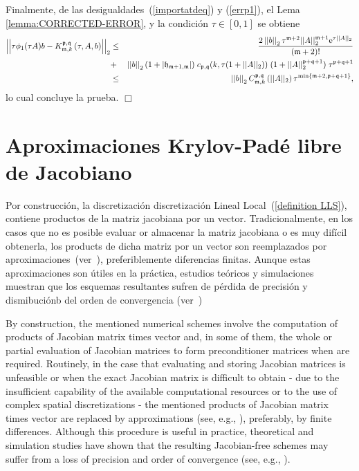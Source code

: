Finalmente, de las desigualdades~(\ref{importatdeq}) y (\ref{errp1}), el Lema \ref{lemma:CORRECTED-ERROR}, y la condición $\tau \in [0,1]$ se obtiene
\begin{eqnarray*}
	\left\lvert\left\lvert  \tau \phi_1(\tau A)b-  K_{\mathfrak{m},k}^{\mathfrak{p},\mathfrak{q}}\left( \tau,  A , b \right)\right\rvert\right\rvert_2
	&\leq& \frac{2 \left\lvert \left\lvert b \right\rvert \right\rvert_2 \tau^{\mathfrak{m}+2}  \vert\lvert A\rvert\rvert^{\mathfrak{m}+1}_2
		\mathrm{e}^{\tau \lvert\lvert A\rvert\rvert_2}}{(\mathfrak{m}+2)!}\\
	&+&
	\left\lvert \left\lvert b \right\rvert \right\rvert_2 (1+\lvert\mathfrak{h}_{\mathfrak{m}+1,\mathfrak{m}}\rvert) \; c_{\mathfrak{p},\mathfrak{q}}(k,\tau (1+\lvert\lvert A \rvert\rvert_2))
	\; (1 + \lvert\lvert A \rvert\rvert_2^{\mathfrak{p}+\mathfrak{q}+1}) \; \tau^{\mathfrak{p}+\mathfrak{q}+1}\\
	& \leq & \left\lvert \left\lvert b \right\rvert \right\rvert_2 C_{\mathfrak{m},k}^{\mathfrak{p},\mathfrak{q}}\left(\lvert\lvert A \rvert\rvert_2\right)\tau^{\mathrm{min}\left\{ \mathfrak{m}+2,\mathfrak{p}+\mathfrak{q}+1 \right\}},
\end{eqnarray*}
lo cual concluye la prueba.
$\Box$

\section{Aproximaciones Krylov-Padé libre de Jacobiano}

Por construcción, la discretización discretización Lineal Local~(\ref{definition LLS}), contiene productos de la matriz jacobiana por un vector. Tradicionalmente, en los casos que no es posible evaluar or almacenar la matriz jacobiana o es muy difícil obtenerla, los products de dicha matriz por un vector son reemplazados por aproximaciones~(ver~\cite{steihaug1979attempt,schmitt1995matrix,weiner1997rowmap,hochbruck1998exponential,hosseini1999matrix,tranquilli2014rosenbrock}), preferiblemente diferencias finitas. Aunque estas aproximaciones son útiles en la práctica, estudios teóricos y simulaciones muestran que los esquemas resultantes sufren de pérdida de precisión y dismibuciónb del orden de convergencia (ver~\cite{wanner1996solving,hochbruck1998exponential,tranquilli2014rosenbrock})


By construction, the mentioned numerical schemes involve the computation of products of Jacobian matrix times vector and, in some of them, the whole or partial evaluation of Jacobian matrices to form preconditioner matrices when are required. Routinely, in the case that evaluating and storing Jacobian matrices is unfeasible or when the exact Jacobian matrix is difficult to obtain - due to the insufficient capability of the available computational resources or to the use of complex spatial discretizations - the mentioned products of Jacobian matrix times vector are replaced by approximations (see, e.g., \cite{Steihaug79,Schmitt95,Weiner97,Hochbruck98,Hosseini99,Tranquilli14_SIAM}), preferably, by finite differences. Although this procedure is useful in practice, theoretical and simulation studies have shown that the resulting Jacobian-free schemes may suffer from a loss of precision and order of convergence (see, e.g., \cite{Hairer96,hochbruck1998exponential,tranquilli2014rosenbrock}). 

